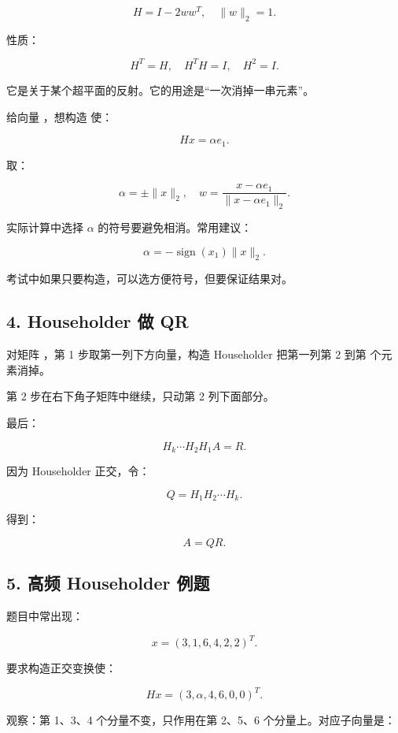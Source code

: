 \documentclass[11pt,a4paper]{ctexart}
\newcommand{\code}[1]{\begingroup\ttfamily\small #1\endgroup}
\begin{document}
\[
H=I-2ww^T,\quad \|w\|_2=1.
\]

性质：

\[
H^T=H,\quad H^TH=I,\quad H^2=I.
\]

它是关于某个超平面的反射。它的用途是“一次消掉一串元素”。

给向量 \code{}，想构造 \code{} 使：

\[
Hx=\alpha e_1.
\]

取：

\[
\alpha=\pm \|x\|_2,
\quad
w=\frac{x-\alpha e_1}{\|x-\alpha e_1\|_2}.
\]

实际计算中选择 $\alpha$ 的符号要避免相消。常用建议：

\[
\alpha=-\operatorname{sign}(x_1)\|x\|_2.
\]

考试中如果只要构造，可以选方便符号，但要保证结果对。


\subsection*{4. Householder 做 QR}


对矩阵 \code{}，第 1 步取第一列下方向量，构造 Householder 把第一列第 2 到第 \code{} 个元素消掉。

第 2 步在右下角子矩阵中继续，只动第 2 列下面部分。

最后：

\[
H_k\cdots H_2H_1A=R.
\]

因为 Householder 正交，令：

\[
Q=H_1H_2\cdots H_k.
\]

得到：

\[
A=QR.
\]


\subsection*{5. 高频 Householder 例题}


题目中常出现：

\[
x=(3,1,6,4,2,2)^T.
\]

要求构造正交变换使：

\[
Hx=(3,\alpha,4,6,0,0)^T.
\]

观察：第 1、3、4 个分量不变，只作用在第 2、5、6 个分量上。对应子向量是：
\end{document}
